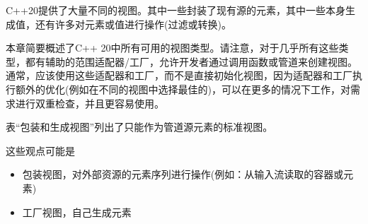 
C++20提供了大量不同的视图。其中一些封装了现有源的元素，其中一些本身生成值，还有许多对元素或值进行操作(过滤或转换)。

本章简要概述了C++ 20中所有可用的视图类型。请注意，对于几乎所有这些类型，都有辅助的范围适配器/工厂，允许开发者通过调用函数或管道来创建视图。通常，应该使用这些适配器和工厂，而不是直接初始化视图，因为适配器和工厂执行额外的优化(例如在不同的视图中选择最佳的)，可以在更多的情况下工作，对需求进行双重检查，并且更容易使用。


表“包装和生成视图”列出了只能作为管道源元素的标准视图。

这些观点可能是

\begin{itemize}
\item
包装视图，对外部资源的元素序列进行操作(例如：从输入流读取的容器或元素)

\item
工厂视图，自己生成元素
\end{itemize}


